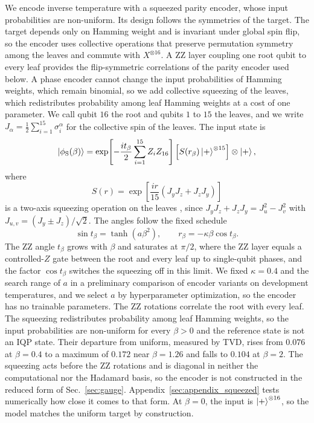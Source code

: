 \documentclass[pra,aps,10pt,twocolumn,floatfix,superscriptaddress, notitlepage,longbibliography]{revtex4-2}
\begin{document}
We encode inverse temperature with a squeezed parity encoder, whose input probabilities are non-uniform. Its design follows the symmetries of the target. The target depends only on Hamming weight and is invariant under global spin flip, so the encoder uses collective operations that preserve permutation symmetry among the leaves and commute with $X^{\otimes16}$. A ZZ layer coupling one root qubit to every leaf provides the flip-symmetric correlations of the parity encoder used below. A phase encoder cannot change the input probabilities of Hamming weights, which remain binomial, so we add collective squeezing of the leaves, which redistributes probability among leaf Hamming weights at a cost of one parameter. We call qubit $16$ the root and qubits $1$ to $15$ the leaves, and we write $J_\alpha=\tfrac12\sum_{i=1}^{15}\sigma^\alpha_i$ for the collective spin of the leaves. The input state is
\begin{equation}
 \ket{\phi_{\mathrm S}(\beta)}=
 \exp\!\left[-\frac{i t_\beta}{2}\sum_{i=1}^{15}Z_iZ_{16}\right]
 \Bigl[S(r_\beta)\ket{+}^{\otimes15}\Bigr]\otimes\ket{+},
 \label{eq:cw_squeezed_input}
\end{equation}
where
\begin{equation}
 S(r)=\exp\!\left[\frac{ir}{15}\left(J_yJ_z+J_zJ_y\right)\right]
\end{equation}
is a two-axis squeezing operation on the leaves \cite{kitagawaSqueezedSpinStates1993}, since $J_yJ_z+J_zJ_y=J_u^2-J_v^2$ with $J_{u,v}=(J_y\pm J_z)/\sqrt2$. The angles follow the fixed schedule
\begin{equation}
 \sin t_\beta=\tanh(a\beta^2),\qquad r_\beta=-\kappa\beta\cos t_\beta .
 \label{eq:cw_squeezed_schedule}
\end{equation}
The ZZ angle $t_\beta$ grows with $\beta$ and saturates at $\pi/2$, where the ZZ layer equals a controlled-$Z$ gate between the root and every leaf up to single-qubit phases, and the factor $\cos t_\beta$ switches the squeezing off in this limit. We fixed $\kappa=0.4$ and the search range of $a$ in a preliminary comparison of encoder variants on development temperatures, and we select $a$ by hyperparameter optimization, so the encoder has no trainable parameters. The ZZ rotations correlate the root with every leaf. The squeezing redistributes probability among leaf Hamming weights, so the input probabilities are non-uniform for every $\beta>0$ and the reference state is not an IQP state. Their departure from uniform, measured by TVD, rises from $0.076$ at $\beta=0.4$ to a maximum of $0.172$ near $\beta=1.26$ and falls to $0.104$ at $\beta=2$. The squeezing acts before the ZZ rotations and is diagonal in neither the computational nor the Hadamard basis, so the encoder is not constructed in the reduced form of Sec.~\ref{sec:gauge}. Appendix~\ref{sec:appendix_squeezed} tests numerically how close it comes to that form. At $\beta=0$, the input is $\ket{+}^{\otimes16}$, so the model matches the uniform target by construction.
\end{document}
